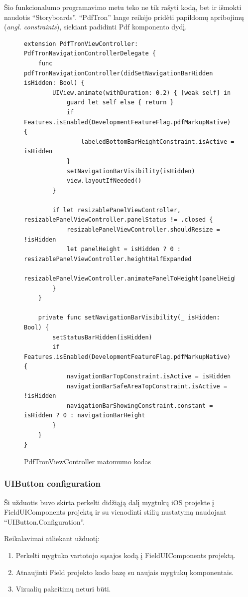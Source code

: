 Šio funkcionalumo programavimo metu teko ne tik rašyti kodą, bet ir išmokti naudotis \enquote{Storyboards}. \enquote{PdfTron} lange reikėjo pridėti papildomų apribojimų (\emph{angl. constraints}), siekiant padidinti Pdf komponento dydį.


\begin{figure}[htbp!]
    \centering
\begin{verbatim}
extension PdfTronViewController: PdfTronNavigationControllerDelegate {
    func pdfTronNavigationController(didSetNavigationBarHidden isHidden: Bool) {
        UIView.animate(withDuration: 0.2) { [weak self] in
            guard let self else { return }
            if Features.isEnabled(DevelopmentFeatureFlag.pdfMarkupNative) {
                labeledBottomBarHeightConstraint.isActive = isHidden
            }
            setNavigationBarVisibility(isHidden)
            view.layoutIfNeeded()
        }

        if let resizablePanelViewController, resizablePanelViewController.panelStatus != .closed {
            resizablePanelViewController.shouldResize = !isHidden
            let panelHeight = isHidden ? 0 : resizablePanelViewController.heightHalfExpanded
            resizablePanelViewController.animatePanelToHeight(panelHeight)
        }
    }

    private func setNavigationBarVisibility(_ isHidden: Bool) {
        setStatusBarHidden(isHidden)
        if Features.isEnabled(DevelopmentFeatureFlag.pdfMarkupNative) {
            navigationBarTopConstraint.isActive = isHidden
            navigationBarSafeAreaTopConstraint.isActive = !isHidden
            navigationBarShowingConstraint.constant = isHidden ? 0 : navigationBarHeight
        }
    }
}
\end{verbatim}
\caption{PdfTronViewController matomumo kodas}
    \label{fig:pdfTronCode}
\end{figure}


    
\subsubsection{UIButton configuration}
Ši užduotis buvo skirta perkelti didžiąją dalį mygtukų iOS projekte į FieldUIComponents projektą ir su vienodinti stilių nustatymą naudojant \enquote{UIButton.Configuration}.

Reikalavimai atliekant užduotį:
\begin{enumerate}
    \item Perkelti mygtuko vartotojo sąsajos kodą į FieldUIComponents projektą.
    \item Atnaujinti Field projekto kodo bazę su naujais mygtukų komponentais.
    \item Vizualių pakeitimų neturi būti.
\end{enumerate}

